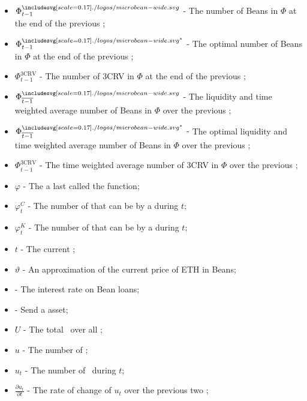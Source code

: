 \documentclass[class=article, crop=false]{standalone}
\begin{document}
\begin{itemize}[topsep=0pt, itemsep=3pt,leftmargin=16pt]
    \item[] $\Phi_{t-1}^{\bean}$ - \hypertarget{ht195}{The number of Beans in $\Phi$ at the end of the previous };
    \item[] $\Phi_{t-1}^{{\bean}^*}$ - \hypertarget{ht196}{The optimal number of Beans in $\Phi$ at the end of the previous };
    \item[] $\Phi_{t-1}^{\text{3CRV}}$ - \hypertarget{ht197}{The number of 3CRV in $\Phi$ at the end of the previous };
    \item[] $\Phi_{\overline{t-1}}^{\bean}$ - \hypertarget{ht198}{The liquidity and time weighted average number of Beans in $\Phi$ over the previous };
    \item[] $\Phi_{\overline{t-1}}^{{\bean}^*}$ - \hypertarget{ht199}{The optimal liquidity and time weighted average number of Beans in $\Phi$ over the previous };
    \item[] $\Phi_{\overline{t-1}}^{\text{3CRV}}$ - \hypertarget{ht200}{The time weighted average number of 3CRV in $\Phi$ over the previous };
    \item[] $\varphi$ - \hypertarget{ht201}{The  a  last called the  function};
    \item[] ${\varphi}_t^C$ - \hypertarget{ht202}{The number of  that can be  by a  during $t$};
    \item[] ${\varphi}_t^K$ - \hypertarget{ht203}{The number of  that can be  by a  during $t$};
    \item[] $t$ - \hypertarget{ht204}{The current };
    \item[] $\vartheta$ - An approximation of the current price of ETH in Beans;
    \item[]  - \hypertarget{ht205}{The interest rate on Bean loans};
    \item[]  - \hypertarget{ht206}{Send a  asset};
    \item[] $U$ - \hypertarget{ht207}{The total  \Bean\ over all };
    \item[] $u$ - \hypertarget{ht208}{The number of  \Bean};
    \item[] $u_t$ - The number of  \Bean\ during $t$;
    \item[] $\frac{\partial u_t}{\partial t}$ - The rate of change of $u_t$ over the previous two ;

\end{itemize}
\end{document}
